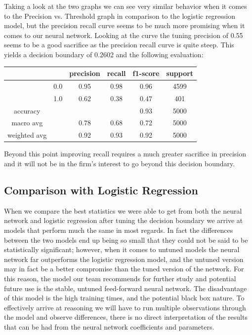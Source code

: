 \documentclass[12pt]{article}
\begin{document}
	Taking a look at the two graphs  we can see very similar behavior when it comes to the Precision vs. Threshold graph in comparison to the logistic regression model, but the precision recall curve seems to be much more promising when it comes to our neural network. Looking at the curve the tuning precision of 0.55 seems to be a good sacrifice as the precision recall curve is quite steep. This yields a decision boundary of 0.2602 and the following evaluation: 
	
	\begin{tabular}{c|c|c|c|c|c}
		\hline
		& 		& 	precision &  recall  & f1-score   & support \\ \hline
		
		&  0.0	&		0.95 &     0.98   &  0.96   &  4599 \\ \hline
		&  1.0  &		0.62 &     0.38   &  0.47   &   401 \\ \hline
		
		accuracy    & & & &                       		  0.93   &   5000 \\ \hline
		macro avg   & &   			0.78   &   0.68  &    0.72   &   5000  \\ \hline
		weighted avg  & &   		0.92   &   0.93  &    0.92   &   5000 \\ \hline
	\end{tabular}
	
	Beyond this point improving recall requires a much greater sacrifice in precision and it will not be in the firm's interest to go beyond this decision boundary. 
	
	\subsection{Comparison with Logistic Regression}
	
	When we compare the best statistics we were able to get from both the neural network and logistic regression after tuning the decision boundary we arrive at models that perform much the same in most regards. In fact the differences between the two models end up being so small that they could not be said to be statistically significant; however, when it comes to untuned models the neural network far outperforms the logistic regression model, and the untuned version may in fact be a better compromise than the tuned version of the network. For this reason, the model our team recommends for further study and potential future use is the stable, untuned feed-forward neural network. The disadvantage of this model is the high training times, and the potential black box nature. To effectively arrive at reasoning we will have to run multiple observations through the model and observe differences, there is no direct interpretation of the results that can be had from the neural network coefficients and parameters. 
	
\end{document}
